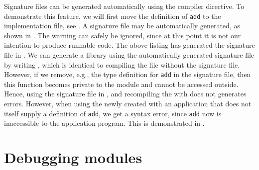 \documentclass[springer.tex]{subfiles}
\begin{document}
Signature files can be generated automatically using the  compiler directive. To demonstrate this feature, we will first move the definition of \lstinline{add} to the implementation file, see .
%
%
A signature file may be automatically generated, as shown in .
%
%
The warning can safely be ignored, since at this point it is not our intention to produce runnable code. The above listing has generated the signature file in .
%
%
We can generate a library using the automatically generated signature file by writing , which is identical to compiling the  file without the signature file. However, if we remove, e.g., the type definition for \lstinline{add} in the signature file, then this function becomes private to the module and cannot be accessed outside. Hence, using the signature file in , and recompiling the  with  does not generates errors. 
%
%
%
%
However, when using the newly created  with an application that does not itself supply a definition of \lstinline{add}, we get a syntax error, since \lstinline{add} now is inaccessible to the application program. This is demonstrated in .
%
%
%

\section{Debugging modules}
\end{document}
